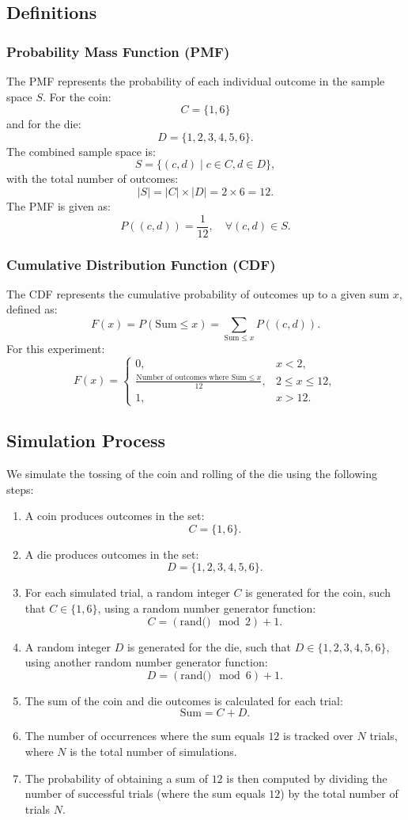 \documentclass[journal]{IEEEtran}
\begin{document}
\subsection*{Definitions}
\subsubsection*{Probability Mass Function (PMF)}
The PMF represents the probability of each individual outcome in the sample space $S$. For the coin:
\[
C = \{1, 6\}
\]
and for the die:
\[
D = \{1, 2, 3, 4, 5, 6\}.
\]
The combined sample space is:
\[
S = \{(c, d) \mid c \in C, d \in D\},
\]
with the total number of outcomes:
\[
|S| = |C| \times |D| = 2 \times 6 = 12.
\]
The PMF is given as:
\[
P((c, d)) = \frac{1}{12}, \quad \forall (c, d) \in S.
\]

\subsubsection*{Cumulative Distribution Function (CDF)}
The CDF represents the cumulative probability of outcomes up to a given sum $x$, defined as:
\[
F(x) = P(\text{Sum} \leq x) = \sum_{\text{Sum} \leq x} P((c, d)).
\]
For this experiment:
\[
F(x) = 
\begin{cases} 
0, & x < 2, \\
\frac{\text{Number of outcomes where Sum} \leq x}{12}, & 2 \leq x \leq 12, \\
1, & x > 12.
\end{cases}
\]

\subsection*{Simulation Process}
We simulate the tossing of the coin and rolling of the die using the following steps:
\begin{enumerate}
    \item A coin produces outcomes in the set:
    \[
    C = \{1, 6\}.
    \]
    \item A die produces outcomes in the set:
    \[
    D = \{1, 2, 3, 4, 5, 6\}.
    \]
    \item For each simulated trial, a random integer \( C \) is generated for the coin, such that \( C \in \{1, 6\} \), using a random number generator function:
    \[
    C = (\text{rand()} \mod 2) + 1.
    \]
    \item A random integer \( D \) is generated for the die, such that \( D \in \{1, 2, 3, 4, 5, 6\} \), using another random number generator function:
    \[
    D = (\text{rand()} \mod 6) + 1.
    \]
    \item The sum of the coin and die outcomes is calculated for each trial:
    \[
    \text{Sum} = C + D.
    \]
    \item The number of occurrences where the sum equals $12$ is tracked over \( N \) trials, where \( N \) is the total number of simulations.
    \item The probability of obtaining a sum of $12$ is then computed by dividing the number of successful trials (where the sum equals $12$) by the total number of trials \( N \).
\end{enumerate}
\end{document}
